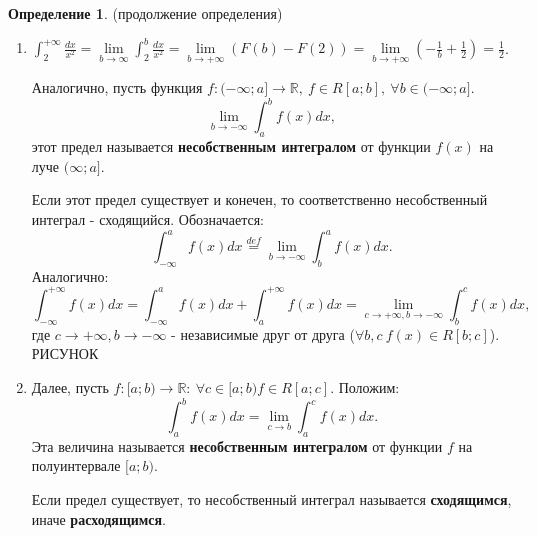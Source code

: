 \documentclass{report}
\theoremstyle{definition}
\newtheorem{definition}{Определение}[section]
\begin{document}
\begin{definition}
  (продолжение определения)

  \begin{enumerate}
    \item $\int_{2}^{+\infty}\frac{dx}{x^2} = \underset{b\rightarrow\infty}{\lim}\int_{2}^{b}\frac{dx}{x^2} =
            \underset{b\rightarrow+\infty}{\lim}(F(b) - F(2)) = \underset{b\rightarrow+\infty}{\lim}(-\frac{1}{b} +
            \frac{1}{2}) = \frac{1}{2}$.

          Аналогично, пусть функция $f:(-\infty;a]\rightarrow\mathbb{R}, \ f\in R[a;b], \ \forall b \in (-\infty;a]$.
          \begin{equation*}
            \underset{b\rightarrow-\infty}{\lim}\int_{a}^{b}f(x)dx,
          \end{equation*}
          этот предел называется \textbf{несобственным интегралом} от функции $f(x)$ на луче $(\infty;a]$.

          Если этот предел существует и конечен, то соответственно несобственный интеграл - сходящийся. Обозначается:
          \begin{equation*}
            \int_{-\infty}^{a}f(x)dx \overset{def}{=}\underset{b\rightarrow-\infty}{\lim}\int_{b}^{a}f(x)dx.
          \end{equation*}
          Аналогично:
          \begin{equation*}
            \int_{-\infty}^{+\infty}f(x)dx = \int_{-\infty}^{a}f(x)dx + \int_{a}^{+\infty}f(x)dx = \underset{c
              \rightarrow+\infty, b\rightarrow-\infty}{\lim}\int_{b}^{c}f(x)dx,
          \end{equation*}
          где $c\rightarrow+\infty, b\rightarrow-\infty$ - независимые друг от друга ($\forall b,c \ f(x)\in
            R[b;c]$). {\Large РИСУНОК}

    \item Далее, пусть $f:[a;b)\rightarrow\mathbb{R}: \ \forall c \in [a;b) f\in R[a;c]$. Положим:
                \begin{equation*}
                  \int_{a}^{b}f(x)dx = \underset{c\rightarrow b}{\lim}\int_{a}^{c}f(x)dx.
                \end{equation*}
                Эта величина называется \textbf{несобственным интегралом} от функции $f$ на полуинтервале $[a;b)$.

                    Если предел существует, то несобственный интеграл называется \textbf{сходящимся}, иначе \textbf{расходящимся}.


\end{enumerate}
\end{definition}
\end{document}
